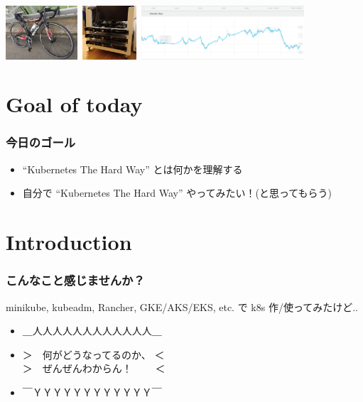 \documentclass[aspectratio=169,11pt,hyperref={colorlinks=true}]{beamer}
\begin{document}
\begin{frame}
\begin{itemize}
    \includegraphics[height=20mm]{images/my-bike.jpg}~\includegraphics[height=20mm]{images/server_front.jpg}~\includegraphics[height=20mm]{images/my-weight.png}
  \end{itemize}
\end{frame}

\section{Goal of today}
\begin{frame}
  \frametitle{今日のゴール}
  \begin{itemize}
    \item ``Kubernetes The Hard Way'' とは何かを理解する
    \item 自分で ``Kubernetes The Hard Way'' やってみたい！(と思ってもらう)
  \end{itemize}
\end{frame}

\section{Introduction}
\begin{frame}
  \frametitle{こんなこと感じませんか？}
  minikube, kubeadm, Rancher, GKE/AKS/EKS, etc. で k8s 作/使ってみたけど..
  \begin{itemize}
    \item[] \Huge{＿人人人人人人人人人人人人＿}
    \item[] \Huge{＞　何がどうなってるのか、 ＜ \\ ＞　ぜんぜんわからん！　　 ＜}
    \item[] \Huge{￣ＹＹＹＹＹＹＹＹＹＹＹＹ￣}
  \end{itemize}
\end{frame}
\end{document}
